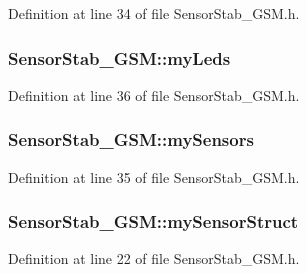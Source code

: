 Definition at line 34 of file Sensor\+Stab\+\_\+\+G\+S\+M.\+h.

\subsubsection[{\texorpdfstring{my\+Leds}{myLeds}}]{ Sensor\+Stab\+\_\+\+G\+S\+M\+::my\+Leds\hspace{0.3cm}{\ttfamily [private]}}\hypertarget{class_sensor_stab___g_s_m_a218084ad1259d098fc89c7532c1aa411}{}\label{class_sensor_stab___g_s_m_a218084ad1259d098fc89c7532c1aa411}


Definition at line 36 of file Sensor\+Stab\+\_\+\+G\+S\+M.\+h.

\subsubsection[{\texorpdfstring{my\+Sensors}{mySensors}}]{ Sensor\+Stab\+\_\+\+G\+S\+M\+::my\+Sensors\hspace{0.3cm}{\ttfamily [private]}}\hypertarget{class_sensor_stab___g_s_m_a440a3e3b518ae7a139f7edf0e2cef237}{}\label{class_sensor_stab___g_s_m_a440a3e3b518ae7a139f7edf0e2cef237}


Definition at line 35 of file Sensor\+Stab\+\_\+\+G\+S\+M.\+h.

\subsubsection[{\texorpdfstring{my\+Sensor\+Struct}{mySensorStruct}}]{ Sensor\+Stab\+\_\+\+G\+S\+M\+::my\+Sensor\+Struct}\hypertarget{class_sensor_stab___g_s_m_ae332d79a90b04c5ff482f3cbf27fd530}{}\label{class_sensor_stab___g_s_m_ae332d79a90b04c5ff482f3cbf27fd530}


Definition at line 22 of file Sensor\+Stab\+\_\+\+G\+S\+M.\+h.

